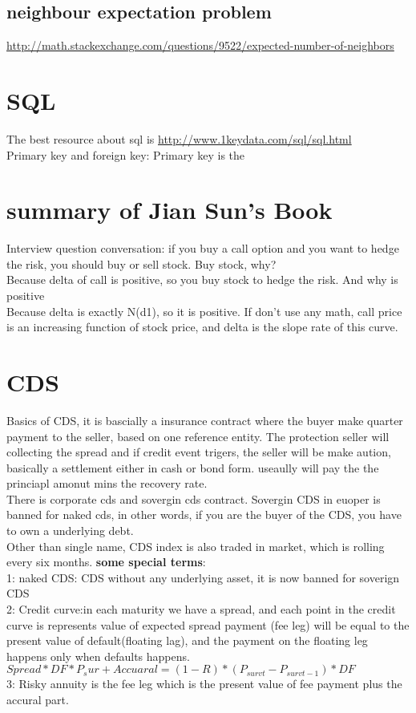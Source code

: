 \documentclass[a4paper,11pt]{article}
\begin{document}
\subsection{neighbour expectation problem}
\url{http://math.stackexchange.com/questions/9522/expected-number-of-neighbors}
\section{SQL}
The best resource about sql is \url{http://www.1keydata.com/sql/sql.html} \\
Primary key and foreign key: Primary key is the
\section{summary of Jian Sun's Book}
Interview question conversation: if you buy a call option and you want to hedge the risk, you should buy or sell stock. Buy stock, why?\\
Because delta of call is positive, so you buy stock to hedge the risk. And why is positive\\
Because delta is exactly N(d1), so it is positive. If don't use any math, call price is an increasing function of stock price, and delta is the slope rate of this curve.


\section{CDS}
Basics of CDS, it is bascially a insurance contract where the buyer make quarter payment to the seller, based on one reference entity. The protection seller will collecting the spread and if credit event trigers, the seller will be make aution, basically a settlement either in cash or bond form. useaully will pay the the princiapl amonut mins the recovery rate.\\ There is corporate cds and sovergin cds contract. Sovergin CDS in euoper is banned for naked cds, in other words, if you are the buyer of the CDS, you have to own a underlying debt.\\
Other than single name, CDS index is also traded in market, which is rolling every six months.
{\bf some special terms}:\\
1: naked CDS: CDS without any underlying asset, it is now banned for soverign CDS\\
2: Credit curve:in each maturity we have a spread, and each point in the credit curve is represents value of expected spread payment (fee leg) will be equal to the present value of default(floating lag), and the payment on the floating leg happens only when defaults happens.\\
$Spread*DF*P_sur+Accuaral=(1-R)*(P_{survt}-P_{survt-1})*DF$\\
3: Risky annuity is the fee leg which is the present value of fee payment plus the accural part.\\
\end{document}
